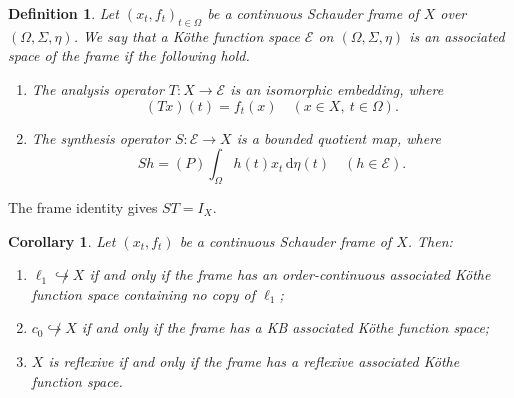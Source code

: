 \documentclass[11pt,leqno]{amsart}
\theoremstyle{compact}
\numberwithin{equation}{section}
\newtheorem{corollary}[theorem]{Corollary}
\newtheorem{definition}[theorem]{Definition}
\theoremstyle{compactremark}
\theoremstyle{compact}
\newcommand{\1}{\mathbbm{1}}
\newcommand{\rmd}{\mathrm{d}}
\begin{document}
\begingroup
\begin{definition}\label{def:associated-space}
Let $(x_t,f_t)_{t\in\Omega}$ be a continuous Schauder frame of $X$ over $(\Omega,\Sigma,\eta)$. We say that a K\"othe function space $\mathcal E$ on $(\Omega,\Sigma,\eta)$ is an \emph{associated space} of the frame if the following hold.
\begin{enumerate}
\item The analysis operator $T\colon X\to\mathcal E$ is an isomorphic embedding, where
\[
(Tx)(t)=f_t(x)\quad(x\in X,\ t\in\Omega).
\]
\item The synthesis operator $S\colon\mathcal E\to X$ is a bounded quotient map, where
\[
Sh=(P)\!\int_\Omega h(t)x_t\,\rmd\eta(t)\quad(h\in\mathcal E).
\]
\end{enumerate}
\end{definition}
\endgroup
The frame identity gives $ST=I_X$.
\begin{corollary}\label{cor:associated-spaces}
Let $(x_t,f_t)$ be a continuous Schauder frame of $X$. Then:
\begin{enumerate}
\item $\ell_1\not\hookrightarrow X$ if and only if the frame has an order-continuous associated K\"othe function space containing no copy of $\ell_1$;
\item $c_0\not\hookrightarrow X$ if and only if the frame has a KB associated K\"othe function space;
\item $X$ is reflexive if and only if the frame has a reflexive associated K\"othe function space.
\end{enumerate}
\end{corollary}
\end{document}
